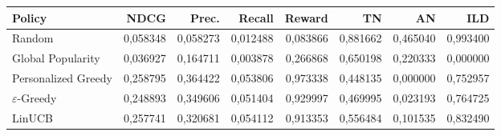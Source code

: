 \begin{tabular}{lrrrrrrr}
\toprule
Policy & NDCG & Prec. & Recall & Reward & TN & AN & ILD \\
\midrule
Random & 0,058348 & 0,058273 & 0,012488 & 0,083866 & 0,881662 & 0,465040 & 0,993400 \\
Global Popularity & 0,036927 & 0,164711 & 0,003878 & 0,266868 & 0,650198 & 0,220333 & 0,000000 \\
Personalized Greedy & 0,258795 & 0,364422 & 0,053806 & 0,973338 & 0,448135 & 0,000000 & 0,752957 \\
$\varepsilon$-Greedy & 0,248893 & 0,349606 & 0,051404 & 0,929997 & 0,469995 & 0,023193 & 0,764725 \\
LinUCB & 0,257741 & 0,320681 & 0,054112 & 0,913353 & 0,556484 & 0,101535 & 0,832490 \\
\bottomrule
\end{tabular}
